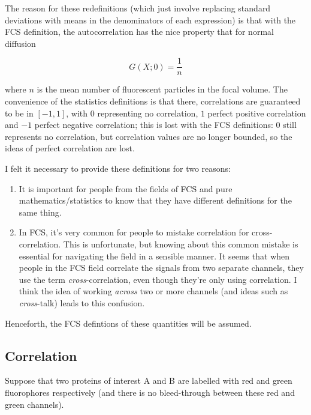 \documentclass[12pt,]{book}
\providecommand{\tightlist}{%
  \setlength{\itemsep}{0pt}\setlength{\parskip}{0pt}}
\theoremstyle{definition}
\theoremstyle{definition}
\theoremstyle{definition}
\theoremstyle{remark}
\let\BeginKnitrBlock\begin \let\EndKnitrBlock\end
\begin{document}
The reason for these redefinitions (which just involve replacing
standard deviations with means in the denominators of each expression)
is that with the FCS definition, the autocorrelation has the nice
property that for normal diffusion

\begin{equation}
G(X; 0) = \frac{1}{n}
\label{eq:FCSautocorrprop}
\end{equation}

where \(n\) is the mean number of fluorescent particles in the focal
volume. The convenience of the statistics definitions is that there,
correlations are guaranteed to be in \([-1, 1]\), with \(0\)
representing no correlation, \(1\) perfect positive correlation and
\(-1\) perfect negative correlation; this is lost with the FCS
definitions: 0 still represents no correlation, but correlation values
are no longer bounded, so the ideas of perfect correlation are lost.

I felt it necessary to provide these definitions for two reasons:

\begin{enumerate}
\def\labelenumi{\arabic{enumi}.}
\tightlist
\item
  It is important for people from the fields of FCS and pure
  mathematics/statistics to know that they have different definitions
  for the same thing.
\item
  In FCS, it's very common for people to mistake correlation for
  cross-correlation. This is unfortunate, but knowing about this common
  mistake is essential for navigating the field in a sensible manner. It
  seems that when people in the FCS field correlate the signals from two
  separate channels, they use the term \emph{cross}-correlation, even
  though they're only using correlation. I think the idea of working
  \emph{across} two or more channels (and ideas such as
  \emph{cross}-talk) leads to this confusion.
\end{enumerate}

\BeginKnitrBlock{remark}
\iffalse{} {Remark. } \fi{}Henceforth, the FCS defintions of these
quantities will be assumed.
\EndKnitrBlock{remark}

\subsection{Correlation}\label{correlation}

Suppose that two proteins of interest A and B are labelled with red and
green fluorophores respectively (and there is no bleed-through between
these red and green channels).
\end{document}
